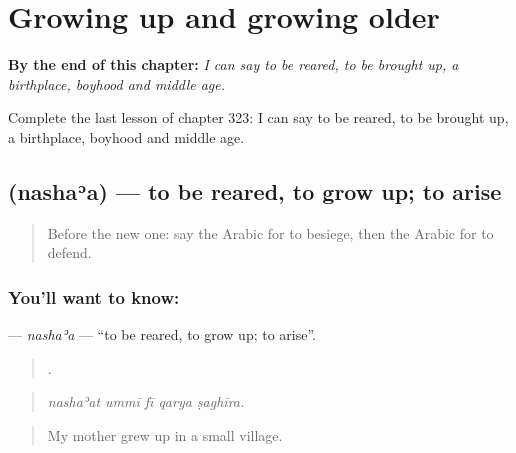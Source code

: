 
\chapter{Growing up and growing older}
\label{ch:ar-growing-up-and-growing-older}

\begin{chapteropening}
\textbf{By the end of this chapter:} \emph{I can say to be reared, to be brought up, a birthplace, boyhood and middle age.}

Complete the last lesson of chapter 323: I can say to be reared, to be brought up, a birthplace, boyhood and middle age.
\end{chapteropening}

\section[\texorpdfstring{\ar{نشأ} (nashaʾa)}{نشأ (nashaʾa)}]{ (nashaʾa) — to be reared, to grow up; to arise}

\label{lesson:AR-C323-nashaa}



\begin{quote}
Before the new one: say the Arabic for to besiege, then the Arabic for to defend.
\end{quote}

\subsection*{You'll want to know: }
\textbf{} — \emph{nashaʾa} — \textquotedblleft{}to be reared, to grow up; to arise\textquotedblright{}.

\begin{quote}
    .
\end{quote}

\begin{quote}
\emph{nashaʾat ummī fī qarya ṣaghīra.}
\end{quote}

\begin{quote}
My mother grew up in a small village.
\end{quote}

